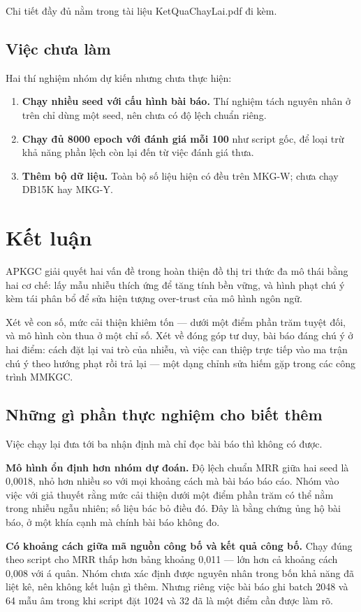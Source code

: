 \documentclass[11pt,a4paper]{article}
\newcommand{\code}[1]{{\ttfamily\small\color{codetext}#1}}
\begin{document}
Chi tiết đầy đủ nằm trong tài liệu \code{KetQuaChayLai.pdf} đi kèm.

\subsection{Việc chưa làm}
Hai thí nghiệm nhóm dự kiến nhưng chưa thực hiện:

\begin{enumerate}\itemsep2pt
\item \textbf{Chạy nhiều seed với cấu hình bài báo.} Thí nghiệm tách nguyên nhân ở trên chỉ dùng một seed, nên chưa có độ lệch chuẩn riêng.
\item \textbf{Chạy đủ 8000 epoch với đánh giá mỗi 100} như script gốc, để loại trừ khả năng phần lệch còn lại đến từ việc đánh giá thưa.
\item \textbf{Thêm bộ dữ liệu.} Toàn bộ số liệu hiện có đều trên MKG-W; chưa chạy DB15K hay MKG-Y.
\end{enumerate}
\section{Kết luận}
APKGC giải quyết hai vấn đề trong hoàn thiện đồ thị tri thức đa mô thái bằng hai cơ chế: lấy mẫu nhiễu thích ứng để tăng tính bền vững, và hình phạt chú ý kèm tái phân bổ để sửa hiện tượng over-trust của mô hình ngôn ngữ.

Xét về con số, mức cải thiện khiêm tốn --- dưới một điểm phần trăm tuyệt đối, và mô hình còn thua ở một chỉ số. Xét về đóng góp tư duy, bài báo đáng chú ý ở hai điểm: cách đặt lại vai trò của nhiễu, và việc can thiệp trực tiếp vào ma trận chú ý theo hướng phạt rồi trả lại --- một dạng chỉnh sửa hiếm gặp trong các công trình MMKGC.

\subsection{Những gì phần thực nghiệm cho biết thêm}
Việc chạy lại đưa tới ba nhận định mà chỉ đọc bài báo thì không có được.

\textbf{Mô hình ổn định hơn nhóm dự đoán.} Độ lệch chuẩn MRR giữa hai seed là 0,0018, nhỏ hơn nhiều so với mọi khoảng cách mà bài báo báo cáo. Nhóm vào việc với giả thuyết rằng mức cải thiện dưới một điểm phần trăm có thể nằm trong nhiễu ngẫu nhiên; số liệu bác bỏ điều đó. Đây là bằng chứng ủng hộ bài báo, ở một khía cạnh mà chính bài báo không đo.

\textbf{Có khoảng cách giữa mã nguồn công bố và kết quả công bố.} Chạy đúng theo script cho MRR thấp hơn bảng khoảng 0,011 --- lớn hơn cả khoảng cách 0,008 với á quân. Nhóm chưa xác định được nguyên nhân trong bốn khả năng đã liệt kê, nên không kết luận gì thêm. Nhưng riêng việc bài báo ghi batch 2048 và 64 mẫu âm trong khi script đặt 1024 và 32 đã là một điểm cần được làm rõ.
\end{document}
